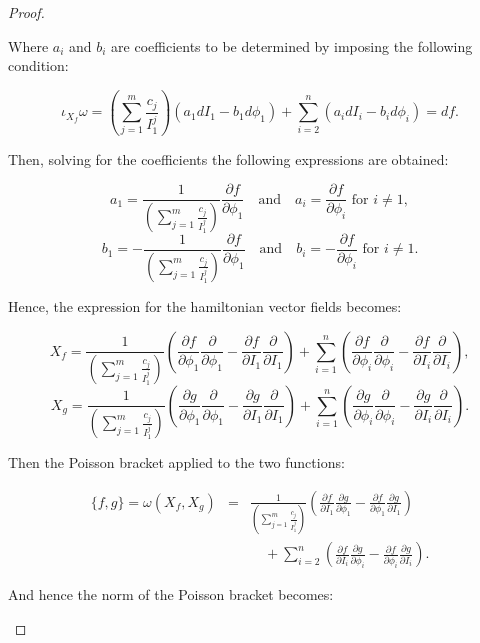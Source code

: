 \begin{proof}
\begin{enumerate}
Where $a_i$ and $b_i$ are coefficients to be determined by imposing the following condition:

$$\iota_{X_f}\omega = \left(\sum_{j=1}^m\frac{c_j}{ I_1^j}\right)(a_1 dI_1 - b_1 d\phi_1) + \sum_{i = 2}^n (a_i dI_i - b_i d\phi_i) = df.$$

Then, solving for the coefficients the following expressions are obtained:

$$a_1  = \frac{1}{\left(\sum_{j=1}^m\frac{c_j}{ I_1^j}\right)}\frac{\partial f}{\partial \phi_1} \quad \text{and} \quad a_i = \frac{\partial f}{\partial \phi_i} \text{ for } i \neq 1,$$
$$b_1  = -\frac{1}{\left(\sum_{j=1}^m\frac{c_j}{ I_1^j}\right)}\frac{\partial f}{\partial \phi_1} \quad \text{and} \quad b_i = -\frac{\partial f}{\partial \phi_i} \text{ for } i \neq 1.$$

Hence, the expression for the hamiltonian vector fields becomes:

$$
X_f = \frac{1}{\left(\sum_{j=1}^m\frac{c_j}{ I_1^j}\right)}\left(\frac{\partial f}{\partial \phi_1}\frac{\partial }{\partial \phi_1}- \frac{\partial f}{\partial I_1}\frac{\partial }{\partial I_1}\right) + \sum_{i = 1}^n\left(\frac{\partial f}{\partial \phi_i}\frac{\partial }{\partial \phi_i}- \frac{\partial f}{\partial I_i}\frac{\partial }{\partial I_i}\right),$$
$$
X_g =  \frac{1}{\left(\sum_{j=1}^m\frac{c_j}{ I_1^j}\right)}\left(\frac{\partial g}{\partial \phi_1}\frac{\partial }{\partial \phi_1}- \frac{\partial g}{\partial I_1}\frac{\partial }{\partial I_1}\right) + \sum_{i = 1}^n\left(\frac{\partial g}{\partial \phi_i}\frac{\partial }{\partial \phi_i}- \frac{\partial g}{\partial I_i}\frac{\partial }{\partial I_i}\right).
$$

Then the Poisson bracket applied to the two functions:

$$
\begin{array}{rcl}
\{f,g\}=\omega(X_f,X_g) & = & \displaystyle \frac{1}{\left(\sum_{j=1}^m\frac{c_j}{ I_1^j}\right)}\left(\frac{\partial f}{\partial I_1}\frac{\partial g}{\partial \phi_1} - \frac{\partial f}{\partial \phi_1}\frac{\partial g}{\partial I_1}\right)
\\
& & \displaystyle \quad + \sum_{i = 2}^n \left(\frac{\partial f}{\partial I_i}\frac{\partial g}{\partial \phi_i} - \frac{\partial f}{\partial \phi_i}\frac{\partial g}{\partial I_i}\right).
\end{array}
$$

And hence the norm of the Poisson bracket becomes:


\end{enumerate}
\end{proof}

